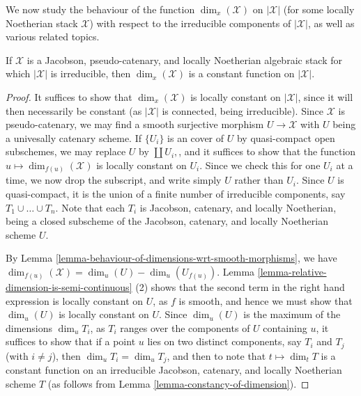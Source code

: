 \noindent
We now study the behaviour of the function $\dim_x(\mathcal{X})$ on
$|\mathcal{X}|$
(for some locally Noetherian stack $\mathcal{X}$) with respect to the
irreducible
components of $|\mathcal{X}|$, as well as various
related topics.

\begin{lemma}
\label{lemma-irreducible-implies-equidimensional}
If $\mathcal{X}$ is
a Jacobson, pseudo-catenary, and locally Noetherian  algebraic stack
for which $|\mathcal{X}|$ is irreducible,
then $\dim_x(\mathcal{X})$ is a constant function on $|\mathcal{X}|$.
\end{lemma}

\begin{proof}
It suffices to show that $\dim_x(\mathcal{X})$ is locally constant on
$|\mathcal{X}|$,
since it will then necessarily be constant (as $|\mathcal{X}|$ is connected,
being irreducible).  Since $\mathcal{X}$ is pseudo-catenary,
we may find a smooth surjective morphism $U \to \mathcal{X}$ with $U$
being a univesally catenary scheme.  If $\{U_i\}$ is an
cover of $U$ by quasi-compact open subschemes, we may replace
$U$ by $\coprod U_i,$, and
it suffices to show that
the function $u \mapsto \dim_{f(u)}(\mathcal{X})$ is locally constant on $U_i$.
Since we check this for one $U_i$ at a time, we now drop the subscript,
and write simply $U$ rather than $U_i$.
Since $U$ is quasi-compact, it
is the union of a finite number of irreducible components,
say $T_1 \cup \ldots \cup T_n$.  Note that each $T_i$ is Jacobson,
catenary, and locally Noetherian,
being a closed subscheme of the Jacobson, catenary, and locally Noetherian
scheme $U$.

\medskip\noindent
By Lemma \ref{lemma-behaviour-of-dimensions-wrt-smooth-morphisms}, we have
$\dim_{f(u)}(\mathcal{X}) = \dim_{u}(U) - \dim_{u}(U_{f(u)}).$
Lemma \ref{lemma-relative-dimension-is-semi-continuous} (2)
shows that the second term in the right hand expression is locally
constant on $U$, as $f$ is smooth,
and hence we must show that $\dim_u(U)$
is locally constant on $U$.  Since $\dim_u(U)$ is the maximum
of the dimensions $\dim_u T_i$, as $T_i$ ranges over the components
of $U$ containing $u$, it suffices to show
that if a point $u$ lies on two distinct components,
say $T_i$ and $T_j$ (with $i \neq j$),
then $\dim_u T_i = \dim_u T_j$,
and then to note that $t\mapsto \dim_t T$ is a constant
function on an irreducible Jacobson,
catenary, and locally Noetherian scheme $T$
(as follows from Lemma \ref{lemma-constancy-of-dimension}).


\end{proof}

